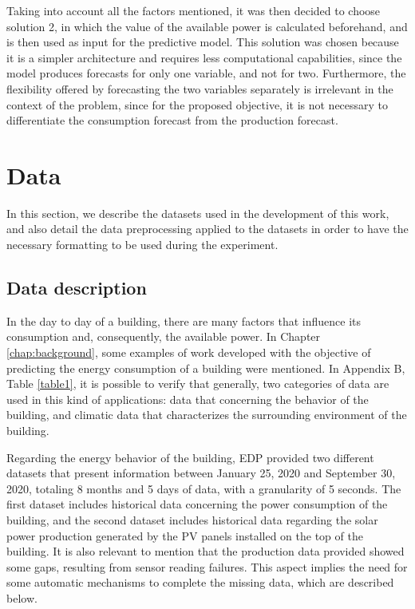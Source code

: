 Taking into account all the factors mentioned, it was then decided to choose solution 2, in which the value of the available power is calculated beforehand, and is then used as input for the predictive model. This solution was chosen because it is a simpler architecture and requires less computational capabilities, since the model produces forecasts for only one variable, and not for two. Furthermore, the flexibility offered by forecasting the two variables separately is irrelevant in the context of the problem, since for the proposed objective, it is not necessary to differentiate the consumption forecast from the production forecast. 

\section{Data}\label{chap3:sec:data}

In this section, we describe the datasets used in the development of this work, and also detail the data preprocessing applied to the datasets in order to have the necessary formatting to be used during the experiment.

\subsection{Data description}\label{chap3:subsec:data_description}

In the day to day of a building, there are many factors that influence its consumption and, consequently, the available power. In Chapter \ref{chap:background}, some examples of work developed with the objective of predicting the energy consumption of a building were mentioned. In Appendix B, Table \ref{table1}, it is possible to verify that generally, two categories of data are used in this kind of applications: data that concerning the behavior of the building, and climatic data that characterizes the surrounding environment of the building.

Regarding the energy behavior of the building, \ac{EDP} provided two different datasets that present information between January 25, 2020 and September 30, 2020, totaling 8 months and 5 days of data, with a granularity of 5 seconds. The first dataset includes historical data concerning the power consumption of the building, and the second dataset includes historical data regarding the solar power production generated by the \ac{PV} panels installed on the top of the building. It is also relevant to mention that the production data provided showed some gaps, resulting from sensor reading failures. This aspect implies the need for some automatic mechanisms to complete the missing data, which are described below.

